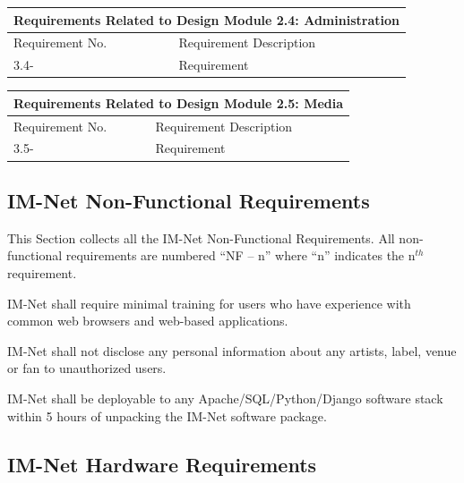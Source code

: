 \documentclass[letterpaper,12pt]{article}
\newcounter{qcounter}						%
\newcounter{rcounter}						%
\newcommand\rnumber{\stepcounter{rcounter}\arabic{rcounter}}
\begin{document}
{\setcounter{rcounter}{0}
\begin{center}
\begin{tabular}{|p{3.5cm}|l|}
\hline 
\multicolumn{2}{|c|}{\textbf{Requirements Related to Design Module 2.4: Administration}} \\ 
\hline 
Requirement No. & Requirement Description \\ 
\hline
3.4-\rnumber & Requirement \\ 
\hline 
\end{tabular} 
\end{center}

\setcounter{rcounter}{0}
\begin{center}
\begin{tabular}{|p{3.5cm}|l|}
\hline 
\multicolumn{2}{|c|}{\textbf{Requirements Related to Design Module 2.5: Media}} \\ 
\hline 
Requirement No. & Requirement Description \\ 
\hline
3.5-\rnumber & Requirement \\ 
\hline 
\end{tabular} 
\end{center}

\textcolor{subsection}{\subsection{IM-Net Non-Functional Requirements}}

This Section collects all the IM-Net Non-Functional Requirements. All non-functional requirements are numbered ``NF -- n'' where ``n'' indicates the n${}^{th}$ requirement.

\begin{list}{NF -- :~}{}

\item  IM-Net shall require minimal training for users who have experience with common web browsers and web-based applications.

\item  IM-Net shall not disclose any personal information about any artists, label, venue or fan to unauthorized users.

\item  IM-Net shall be deployable to any Apache/SQL/Python/Django software stack within 5 hours of unpacking the IM-Net software package.

\end{list}

\textcolor{subsection}{\subsection{IM-Net Hardware Requirements}}

}
\end{document}
